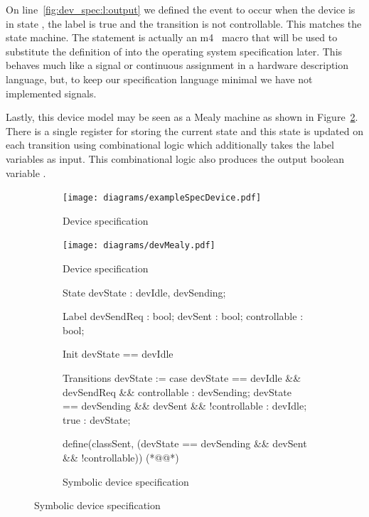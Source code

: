 On line~\ref{fig:dev_spec:l:output} we defined the  event to occur when the device is in state , the  label is true and the transition is not controllable. This matches the state machine. The  statement is actually an m4~\cite{m4} macro that will be used to substitute the definition of  into the operating system specification later. This behaves much like a signal or continuous assignment in a hardware description language, but, to keep our specification language minimal we have not implemented signals.

Lastly, this device model may be seen as a Mealy machine as shown in Figure~\ref{fig:dev_spec_mealy}. There is a single register for storing the current state and this state is updated on each transition using combinational logic which additionally takes the label variables as input. This combinational logic also produces the output boolean variable .

\begin{figure}
\centering
\begin{subfigure}[t]{0.47\textwidth}
\texttt{[image: diagrams/exampleSpecDevice.pdf]}
\caption{Device specification}
\label{fig:dev_spec}
\end{subfigure}
\hfill
\begin{subfigure}[t]{0.47\textwidth}
\texttt{[image: diagrams/devMealy.pdf]}
\caption{Device specification}
\label{fig:dev_spec_mealy}
\end{subfigure}
\par\bigskip
\begin{subfigure}[b]{\textwidth}
\begin{asllisting}
State
devState : {devIdle, devSending};

Label
devSendReq   : bool;
devSent      : bool;
controllable : bool;

Init
devState == devIdle

Transitions
devState := case {
    devState == devIdle && devSendReq && controllable  : devSending;
    devState == devSending && devSent && !controllable : devIdle;
    true                                               : devState;
}

define(classSent, (devState == devSending && devSent && !controllable)) (*@\label{fig:dev_spec:l:output}@*)
\end{asllisting}
\caption{Symbolic device specification}
\label{fig:dev_spec_asl}
\end{subfigure}
\end{figure}


